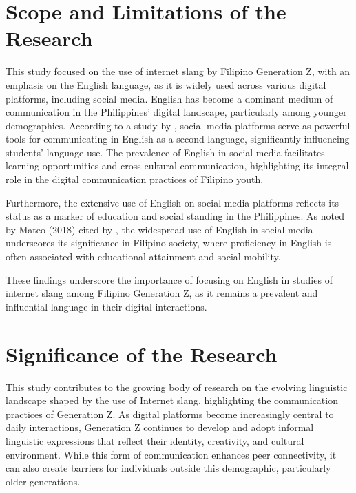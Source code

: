 \section{Scope and Limitations of the Research}
\label{sec:scope}
This study focused on the use of internet slang by Filipino Generation Z, with an emphasis on the English language, as it is widely used across various digital platforms, including social media. English has become a dominant medium of communication in the Philippines' digital landscape, particularly among younger demographics. According to a study by \cite{Olobia_2024}, social media platforms serve as powerful tools for communicating in English as a second language, significantly influencing students' language use. The prevalence of English in social media facilitates learning opportunities and cross-cultural communication, highlighting its integral role in the digital communication practices of Filipino youth.

Furthermore, the extensive use of English on social media platforms reflects its status as a marker of education and social standing in the Philippines. As noted by Mateo (2018) cited by \cite{Esquivel_2019}, the widespread use of English in social media underscores its significance in Filipino society, where proficiency in English is often associated with educational attainment and social mobility.

These findings underscore the importance of focusing on English in studies of internet slang among Filipino Generation Z, as it remains a prevalent and influential language in their digital interactions.

\section{Significance of the Research}
\label{sec:significance}
This study contributes to the growing body of research on the evolving linguistic landscape shaped by the use of Internet slang, highlighting the communication practices of Generation Z. As digital platforms become increasingly central to daily interactions, Generation Z continues to develop and adopt informal linguistic expressions that reflect their identity, creativity, and cultural environment. While this form of communication enhances peer connectivity, it can also create barriers for individuals outside this demographic, particularly older generations.

